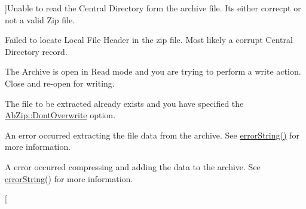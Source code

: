 \begin{Desc}
\begin{description}
{}]Unable to read the Central Directory form the archive file. It\textquotesingle{}s either correcpt or not a valid Zip file. \item[{\em 
Seek\+Error\hypertarget{class_ab_zip_ac669c2fce0fbde75677d12711c11c504a501e9909cf9ff21a190916fa9ba04d24}{}\label{class_ab_zip_ac669c2fce0fbde75677d12711c11c504a501e9909cf9ff21a190916fa9ba04d24}
}]Failed to locate Local File Header in the zip file. Most likely a corrupt Central Directory record. \item[{\em 
Open\+In\+Read\+Only\hypertarget{class_ab_zip_ac669c2fce0fbde75677d12711c11c504a67c493072811f65bc610ba548c1a58c7}{}\label{class_ab_zip_ac669c2fce0fbde75677d12711c11c504a67c493072811f65bc610ba548c1a58c7}
}]The Archive is open in Read mode and you are trying to perform a write action. Close and re-\/open for writing. \item[{\em 
File\+Exists\hypertarget{class_ab_zip_ac669c2fce0fbde75677d12711c11c504abf9ead9668e2736dabaf19715a34b91e}{}\label{class_ab_zip_ac669c2fce0fbde75677d12711c11c504abf9ead9668e2736dabaf19715a34b91e}
}]The file to be extracted already exists and you have specified the \hyperlink{class_ab_zip_a9c4f57d6b8d9a449c2eb6c4d4e53c9d5afe12bba10bd24a3bf1da93500fd5c401}{Ab\+Zip\+::\+Dont\+Overwrite} option. \item[{\em 
Extract\+Failed\hypertarget{class_ab_zip_ac669c2fce0fbde75677d12711c11c504afd59228859ee6670b7ecd0c4c59db347}{}\label{class_ab_zip_ac669c2fce0fbde75677d12711c11c504afd59228859ee6670b7ecd0c4c59db347}
}]An error occurred extracting the file data from the archive. See \hyperlink{class_ab_zip_a218ae44456c9e7518ad22fb9f8fd7466}{error\+String()} for more information. \item[{\em 
Add\+File\+Failed\hypertarget{class_ab_zip_ac669c2fce0fbde75677d12711c11c504a75a9dbed21bb60a9b71c8334ad48fe01}{}\label{class_ab_zip_ac669c2fce0fbde75677d12711c11c504a75a9dbed21bb60a9b71c8334ad48fe01}
}]A error occurred compressing and adding the data to the archive. See \hyperlink{class_ab_zip_a218ae44456c9e7518ad22fb9f8fd7466}{error\+String()} for more information. \item[{\em 
}
\end{description}
\end{Desc}
